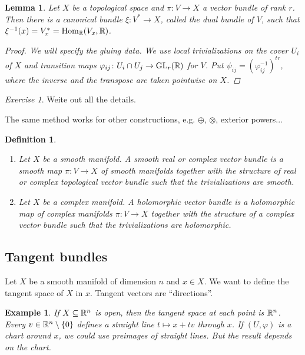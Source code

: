 \documentclass[A4paper, british]{amsart}
\theoremstyle{darkgreentheorem}
\newtheorem{lm}[thm]{Lemma}
\theoremstyle{darkbluedefinition}
\newtheorem{defn}[thm]{Definition}
\theoremstyle{darkredexample}
\newtheorem{exa}[thm]{Example}
\theoremstyle{remark}
\newtheorem{exe}[thm]{Exercise}
\DeclareMathOperator{\Hom}{Hom}
\DeclareMathOperator{\GL}{GL}
\newcommand{\1}{\mathbbm{1}}
\newcommand{\ot}{\otimes}
\newcommand{\op}{\oplus}
\newcommand{\sub}{\subseteq}
\begin{document}
\begin{lm}
    Let $X$ be a topological space and $\pi\colon V\to X$ a vector bundle of rank $r$.
    Then there is a canonical bundle $\xi \colon V^{*}\to X$, called the \textit{dual bundle} of $V$, such that $\xi^{-1}(x)=V_{x}^{*}=\Hom_{\R}(V_{x},\R)$.
    \begin{proof}
	We will specify the gluing data.
	We use local trivializations on the cover $U_{i}$ of $X$ and transition maps $\varphi_{ij}\colon U_{i}\cap U_{j}\to \GL_{r}(\R)$ for $V$.
	Put $\psi_{ij}=(\varphi_{ij}^{-1})^{tr}$, where the inverse and the transpose are taken pointwise on $X$.
    \end{proof}
\end{lm}

\begin{exe}
    Weite out all the details.
\end{exe}

The same method works for other constructions, e.g. $\op$, $\ot$, exterior powers...

\begin{defn}
    \begin{enumerate}[label=\roman*)]
	\item Let $X$ be a smooth manifold.
	    A smooth real or complex vector bundle is a smooth map $\pi\colon V\to X$ of smooth manifolds together with the structure of real or complex topological vector bundle such that the trivializations are smooth.
	\item Let $X$ be a complex manifold.
	    A holomorphic vector bundle is a holomorphic map of complex manifolds $\pi \colon V\to X$ together with the structure of a complex vector bundle such that the trivializations are holomorphic.
    \end{enumerate}
\end{defn}

\subsection{Tangent bundles}

Let $X$ be a smooth manifold of dimension $n$ and $x\in X$.
We want to define the tangent space of $X$ in $x$.
Tangent vectors are ``directions''.

\begin{exa}
    If $X\sub \R^{n}$ is open, then the tangent space at each point is $\mathbb{R}^{n}$.
    Every $v\in \mathbb{R}^{n}\setminus \{ 0\}$ defines a straight line $t\mapsto x+tv$ through $x$.
    If $(U,\varphi)$ is a chart around $x$, we could use preimages of straight lines.
    But the result depends on the chart.
\end{exa}
\end{document}
